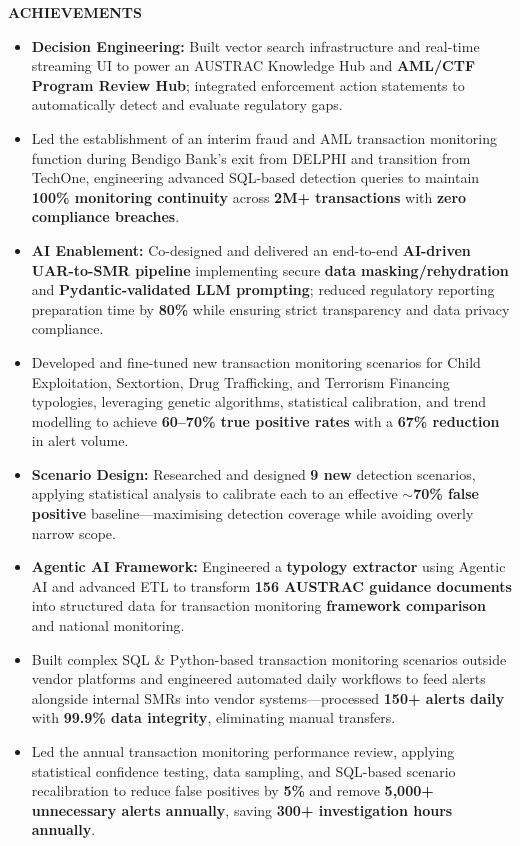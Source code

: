 \documentclass[11pt,a4paper]{article}
\begin{document}
\begin{mdframed}[style=dashedleft]
\textbf{ACHIEVEMENTS}
\begin{itemize}[leftmargin=1.5em, itemsep=4pt]
    \item \textbf{Decision Engineering:} Built vector search infrastructure and real-time streaming UI to power an AUSTRAC Knowledge Hub and \textbf{AML/CTF Program Review Hub}; integrated enforcement action statements to automatically detect and evaluate regulatory gaps.
    \item Led the establishment of an interim fraud and AML transaction monitoring function during Bendigo Bank’s exit from DELPHI and transition from TechOne, engineering advanced SQL-based detection queries to maintain \textbf{100\% monitoring continuity} across \textbf{2M+ transactions} with \textbf{zero compliance breaches}.
    \item \textbf{AI Enablement:} Co-designed and delivered an end-to-end \textbf{AI-driven UAR-to-SMR pipeline} implementing secure \textbf{data masking/rehydration} and \textbf{Pydantic-validated LLM prompting}; reduced regulatory reporting preparation time by \textbf{80\%} while ensuring strict transparency and data privacy compliance.
    \item Developed and fine-tuned new transaction monitoring scenarios for Child Exploitation, Sextortion, Drug Trafficking, and Terrorism Financing typologies, leveraging genetic algorithms, statistical calibration, and trend modelling to achieve \textbf{60--70\% true positive rates} with a \textbf{67\% reduction} in alert volume.
    \item \textbf{Scenario Design:} Researched and designed \textbf{9 new} detection scenarios, applying statistical analysis to calibrate each to an effective \textbf{$\sim$70\% false positive} baseline—maximising detection coverage while avoiding overly narrow scope.
    \item \textbf{Agentic AI Framework:} Engineered a \textbf{typology extractor} using Agentic AI and advanced ETL to transform \textbf{156 AUSTRAC guidance documents} into structured data for transaction monitoring \textbf{framework comparison} and national monitoring.
    \item Built complex SQL \& Python-based transaction monitoring scenarios outside vendor platforms and engineered automated daily workflows to feed alerts alongside internal SMRs into vendor systems—processed \textbf{150+ alerts daily} with \textbf{99.9\% data integrity}, eliminating manual transfers.
    \item Led the annual transaction monitoring performance review, applying statistical confidence testing, data sampling, and SQL-based scenario recalibration to reduce false positives by \textbf{5\%} and remove \textbf{5,000+ unnecessary alerts annually}, saving \textbf{300+ investigation hours annually}.

\end{itemize}
\end{mdframed}
\end{document}
